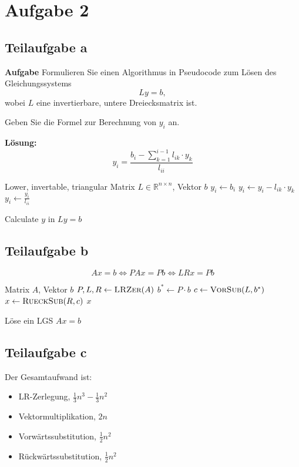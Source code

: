 \section*{Aufgabe 2}
\subsection*{Teilaufgabe a}
\textbf{Aufgabe}
Formulieren Sie einen Algorithmus in Pseudocode zum Lösen des Gleichungssystems
\[Ly = b,\]
wobei $L$ eine invertierbare, untere Dreiecksmatrix ist.

Geben Sie die Formel zur Berechnung von $y_i$ an.

\textbf{Lösung:} 
\[y_i = \frac{b_i - \sum_{k=1}^{i-1} l_{ik} \cdot y_k}{l_{ii}}\]

\begin{algorithm}[H]
    \begin{algorithmic}
    \Require Lower, invertable, triangular Matrix $L \in \mathbb{R}^{n \times n}$, Vektor $b$
			\State $y_i \gets b_i$
				\State $y_i \gets y_i - l_{ik} \cdot y_k$
			\EndFor
			\State $y_i \gets \frac{y_i}{l_{ii}}$
		\EndFor
	\EndProcedure
    \end{algorithmic}
\caption{Calculate $y$ in $Ly = b$}
\end{algorithm}

\subsection*{Teilaufgabe b}
\[Ax = b \Leftrightarrow PAx = Pb \Leftrightarrow LRx = Pb \]

\begin{algorithm}[H]
    \begin{algorithmic}
    \Require Matrix $A$, Vektor $b$
    	\State $P, L, R \gets \Call{LRZer}{A}$
		\State $b^* \gets P \cdot b$
		\State $c \gets \Call{VorSub}{L, b^*}$
		\State $x \gets \Call{RueckSub}{R, c}$
		\State \Return $x$
	\EndProcedure
    \end{algorithmic}
\caption{Löse ein LGS $Ax = b$}
\end{algorithm}

\subsection*{Teilaufgabe c}
Der Gesamtaufwand ist:
\begin{itemize}
	\item LR-Zerlegung, $\frac{1}{3}n^3 - \frac{1}{3} n^2$
	\item Vektormultiplikation, $2n$
	\item Vorwärtssubstitution, $\frac{1}{2} n^2$
	\item Rückwärtssubstitution, $\frac{1}{2} n^2$
\end{itemize}
